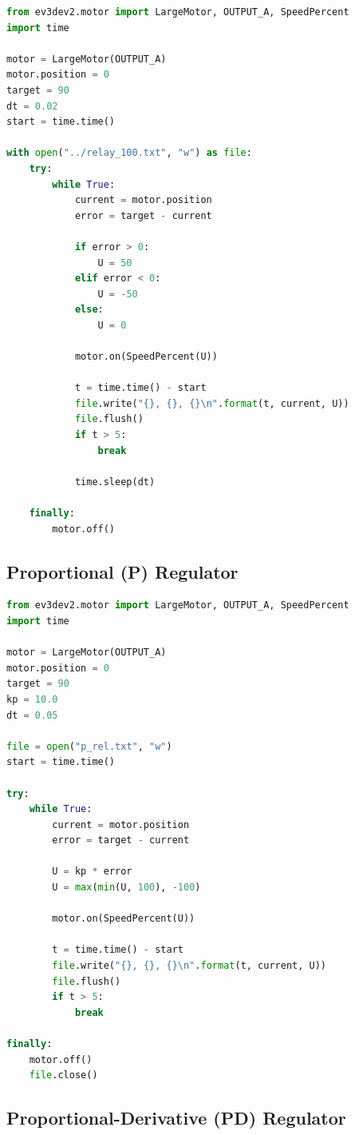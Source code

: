 \documentclass[a4paper, 12pt]{article}
\begin{document}
\begin{lstlisting}[language=Python, caption={Relay Regulator (1relay\_control.py)}]
from ev3dev2.motor import LargeMotor, OUTPUT_A, SpeedPercent
import time

motor = LargeMotor(OUTPUT_A)
motor.position = 0
target = 90
dt = 0.02
start = time.time()

with open("../relay_100.txt", "w") as file:
    try:
        while True:
            current = motor.position
            error = target - current

            if error > 0:
                U = 50
            elif error < 0:
                U = -50
            else:
                U = 0

            motor.on(SpeedPercent(U))

            t = time.time() - start
            file.write("{}, {}, {}\n".format(t, current, U))
            file.flush()
            if t > 5:
                break

            time.sleep(dt)

    finally:
        motor.off()
\end{lstlisting}

\subsection{Proportional (P) Regulator}

\begin{lstlisting}[language=Python, caption={Proportional Regulator (2p\_control.py)}]
from ev3dev2.motor import LargeMotor, OUTPUT_A, SpeedPercent
import time

motor = LargeMotor(OUTPUT_A)
motor.position = 0
target = 90
kp = 10.0
dt = 0.05

file = open("p_rel.txt", "w")
start = time.time()

try:
    while True:
        current = motor.position
        error = target - current

        U = kp * error
        U = max(min(U, 100), -100)

        motor.on(SpeedPercent(U))

        t = time.time() - start
        file.write("{}, {}, {}\n".format(t, current, U))
        file.flush()
        if t > 5:
            break

finally:
    motor.off()
    file.close()
\end{lstlisting}

\subsection{Proportional-Derivative (PD) Regulator}
\end{document}
